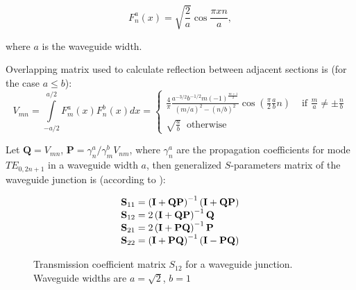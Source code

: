 \documentclass{pj}
\begin{document}
\begin{equation}
  \label{eq:eigen_functions}
  F_n^a(x) = \sqrt{\frac{2}{a}} \cos{\frac{\pi x n}{a}},
\end{equation}

where $a$ is the waveguide width. 

Overlapping matrix used to calculate reflection between adjacent
sections is (for the case $a \le b$):
\begin{equation}
  \label{eq:overlapping}
  V_{mn} = \int\limits_{-a/2}^{a/2}F_m^a(x) F_n^b(x) dx =
  \begin{cases}
    \frac{4}{\pi} \frac{a^{-3/2} b^{-1/2} m
      (-1)^{\frac{m+1}{2}}}{\left(m/a\right)^2 -
      \left(n/b\right)^2} \cos{\left(\frac{\pi}{2}\frac{a}{b}n\right)}& \text{ if }\frac{m}{a} \ne \pm \frac{n}{b} \\
    \sqrt{\frac{a}{b}}~\text{ otherwise}
  \end{cases}
\end{equation}

Let $\mathbf{Q} = V_{mn}$,
$\mathbf{P} = \gamma_n^a/\gamma_m^b V_{nm}$, where $\gamma_n^a$ are
the propagation coefficients for mode $TE_{0, 2n+1}$ in a waveguide
width $a$, then generalized $S$-parameters matrix of the waveguide
junction is (according to \cite{conciauro2000advanced}):

\begin{equation}
  \label{eq:s_matrix}
  \begin{array}{r@{}l}
    \mathbf{S}_{11} &{}= \left(\mathbf{I} + \mathbf{Q P}\right)^{-1} \left(\mathbf{I} + \mathbf{Q P}\right) \\
    \mathbf{S}_{12} &{}= 2\left(\mathbf{I} + \mathbf{Q P}\right)^{-1}\mathbf{Q} \\
    \mathbf{S}_{21} &{}= 2\left(\mathbf{I} + \mathbf{P Q}\right)^{-1}\mathbf{P} \\
    \mathbf{S}_{22} &{}= \left(\mathbf{I} + \mathbf{P Q}\right)^{-1}\left(\mathbf{I} - \mathbf{P Q}\right)
  \end{array}
\end{equation}

\begin{figure}
  
  \caption{Transmission coefficient matrix $S_{12}$ for a waveguide
    junction. Waveguide widths are $a=\sqrt{2}$, $b=1$}
  \label{fig:s12_matrix}
\end{figure}
\end{document}
